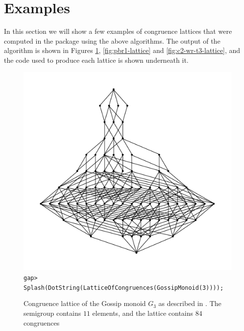 \section{Examples}
\label{sec:lattice-examples}

In this section we will show a few examples of congruence lattices that were
computed in the \Semigroups{} package \cite{semigroups} using the above algorithms.
The output of the algorithm is shown in Figures \ref{fig:g3-lattice},
\ref{fig:pbr1-lattice} and \ref{fig:c2-wr-t3-lattice}, and the code used to
produce each lattice is shown underneath it.

\begin{figure}[ht]
  \centering
  \includegraphics[width=\textwidth]{pics/ch-lattice/gossip3.pdf}
  \texttt{gap> Splash(DotString(LatticeOfCongruences(GossipMonoid(3))));}
  \caption[Congruence lattice of the Gossip monoid $G_3$]
  {Congruence lattice of the Gossip monoid $G_3$ as described in \cite[\S2]{gossip}.  The
    semigroup contains $11$ elements, and the lattice contains $84$ congruences}
  \label{fig:g3-lattice}
\end{figure}

